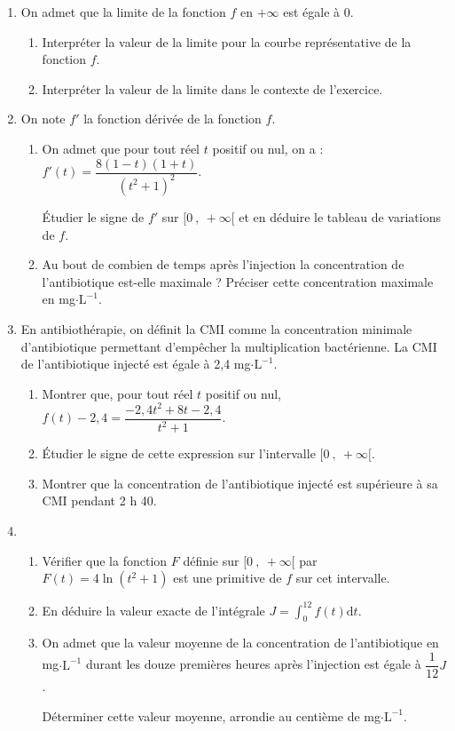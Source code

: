 \documentclass[10pt,a4paper,french]{article}
\begin{document}
\begin{enumerate}
\item  On admet que la limite de la fonction $f$ en $+\infty$ est égale à 0.
	\begin{enumerate}
		\item Interpréter la valeur de la limite pour la courbe représentative de la fonction $f$.
		\item Interpréter la valeur de la limite dans le contexte de l’exercice.
	\end{enumerate}
\item On note $f'$ la fonction dérivée de la fonction $f$.
	\begin{enumerate}
		\item On admet que pour tout réel $t$ positif ou nul, on a :$f'(t)=\dfrac{8(1- t)(1+ t)}{(t^2+1)^2}$.

Étudier le signe de $f'$ sur $[0~,~+\infty[$ et en déduire le tableau de variations de $f$.
		\item Au bout de combien de temps après l’injection la concentration de l’antibiotique est-elle
maximale ? Préciser cette concentration maximale en mg$\cdot \text{L}^{-1}$.
	\end{enumerate}
\item En antibiothérapie, on définit la CMI comme la concentration minimale d’antibiotique permettant
d’empêcher la multiplication bactérienne. La CMI de l’antibiotique injecté est égale à 2,4 mg$\cdot \text{L}^{-1}$.
	\begin{enumerate}
		\item Montrer que, pour tout réel $t$ positif ou nul, $f(t) - 2,4 =\dfrac{-2,4t^2+8t-2,4}{t^2+1}$.
		\item Étudier le signe de cette expression sur l’intervalle $[0~,~+\infty[$.
		\item Montrer que la concentration de l’antibiotique injecté est supérieure à sa CMI pendant 2 h 40.
	\end{enumerate}
\item
	\begin{enumerate}
		\item Vérifier que la fonction $F$ définie sur $[0~,~+\infty[$ par $F(t)= 4 \ln( t^2+1)$ est une primitive de $f$ sur cet intervalle.
		\item En déduire la valeur exacte de l’intégrale $\displaystyle J=\int_0^{12} f(t)\mathrm{d}t$.
		\item On admet que la valeur moyenne de la concentration de l’antibiotique en mg$\cdot\text{L}^{-1}$ durant les douze premières heures après l’injection est égale à $ \dfrac{1}{12}J$.

Déterminer cette valeur moyenne, arrondie au centième de mg$\cdot \text{L}^{-1}$.
	\end{enumerate}
\end{enumerate}
\end{document}
